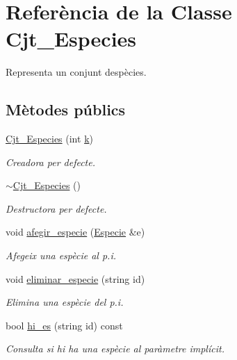 \hypertarget{class_cjt___especies}{}\section{Referència de la Classe Cjt\+\_\+\+Especies}
\label{class_cjt___especies}


Representa un conjunt d\textquotesingle{}espècies.  


\subsection*{Mètodes públics}
\begin{DoxyCompactItemize}
\item 
\hyperlink{class_cjt___especies_aeb3b22c649a5c8bfd3dfb66178c54338}{Cjt\+\_\+\+Especies} (int \hyperlink{class_cjt___especies_a4586fb4724b7af4b7f00bb0c0bdd6a17}{k})
\begin{DoxyCompactList}\small\item\em Creadora per defecte. \end{DoxyCompactList}\item 
\hyperlink{class_cjt___especies_a1ca01609e28327635b4c1d4eb5baea5d}{$\sim$\+Cjt\+\_\+\+Especies} ()
\begin{DoxyCompactList}\small\item\em Destructora per defecte. \end{DoxyCompactList}\item 
void \hyperlink{class_cjt___especies_aa70101c5e157fd855475248c174e41f1}{afegir\+\_\+especie} (\hyperlink{class_especie}{Especie} \&e)
\begin{DoxyCompactList}\small\item\em Afegeix una espècie al p.\+i. \end{DoxyCompactList}\item 
void \hyperlink{class_cjt___especies_af47e196f53a7e4f69dda79b9b8f709b1}{eliminar\+\_\+especie} (string id)
\begin{DoxyCompactList}\small\item\em Elimina una espècie del p.\+i. \end{DoxyCompactList}\item 
bool \hyperlink{class_cjt___especies_a35ea93ace40167f444bade9e8362c7e4}{hi\+\_\+es} (string id) const
\begin{DoxyCompactList}\small\item\em Consulta si hi ha una espècie al paràmetre implícit. \end{DoxyCompactList}\item 

\end{DoxyCompactItemize}
